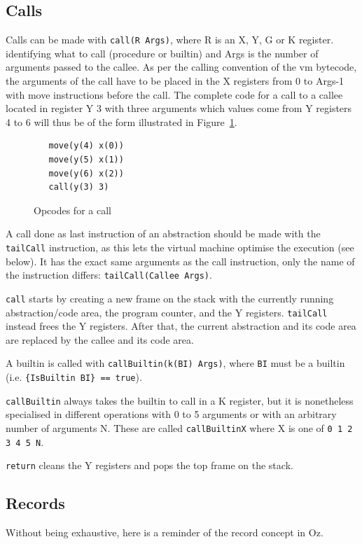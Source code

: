 \documentclass[a4paper]{memoir}
\begin{document}
\subsection{Calls}\label{sec:opcode:calls}
Calls can be made with \lstinline!call(R Args)!, where R is an 
X, Y, G or K register.
identifying what to call (procedure or builtin) and Args is the number of
arguments passed to the callee. As per the calling convention of the vm bytecode, the arguments of the call have to be placed in the X registers from 0
to Args-1 with move instructions before the call. The complete code for a call to a callee
located in register Y 3 with three arguments which values come from Y registers
4 to 6 will thus be of the form illustrated in
Figure~\ref{fig:opcodes:callexample}.
\begin{figure}[h]
\begin{lstlisting}
   move(y(4) x(0))
   move(y(5) x(1))
   move(y(6) x(2))
   call(y(3) 3)
\end{lstlisting}
\caption{Opcodes for a call}
\label{fig:opcodes:callexample}
\end{figure}


A call done as last instruction of an abstraction should be made with the
\lstinline!tailCall! instruction, as this lets the virtual machine optimise the
execution (see below). It has the exact same arguments as the call instruction, only the
name of the instruction differs: \lstinline!tailCall(Callee Args)!.

\lstinline!call! starts by creating a new frame on the stack with the currently
running abstraction/code area, the program counter, and the Y registers.
\lstinline!tailCall! instead frees the Y registers.
After that, the current abstraction and its code area are replaced by the callee
and its code area.


A builtin is called with \lstinline!callBuiltin(k(BI) Args)!, where
\lstinline!BI! must be a builtin (i.e. \lstinline!{IsBuiltin BI} == true!).

\lstinline!callBuiltin! always takes the builtin to call in a K register, but it is nonetheless specialised in different operations with 0 to 5
arguments or with an arbitrary number of arguments N. These are called
\lstinline!callBuiltinX! where X is one of \lstinline!0 1 2 3 4 5 N!.

\lstinline!return! cleans the Y registers and pops the top frame on the stack.


\subsection{Records}\label{sec:opcode:records}
Without being exhaustive, here is a reminder of the record concept in Oz. 
\end{document}
